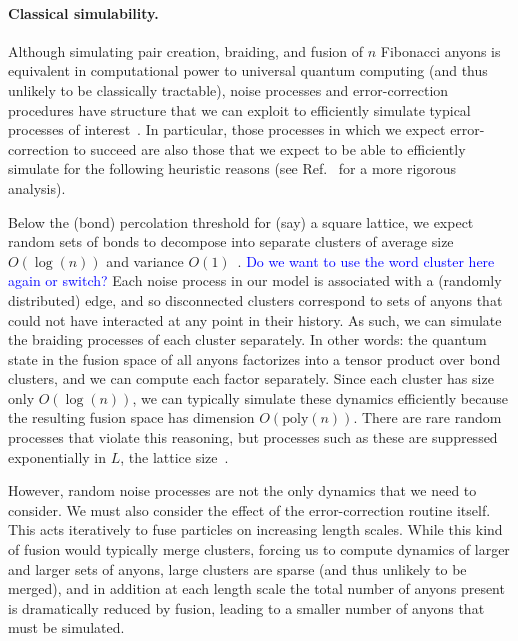 \documentclass[aps, prl, letterpaper, twocolumn, superscriptaddress, notitlepage, 10pt]{revtex4-1}
\newcommand{\cggb}[1]{\textcolor{blue}{#1}}
\begin{document}
\paragraph{Classical simulability.}

Although simulating pair creation, braiding, and fusion of $n$ Fibonacci anyons is equivalent 
in computational power to universal quantum computing (and thus unlikely to be classically 
tractable), noise processes and error-correction procedures have structure that we can 
exploit to efficiently simulate typical processes of interest~\cite{RGsim}. In particular, those 
processes in which we expect error-correction to succeed are also those that we expect to 
be able to efficiently simulate for the following heuristic reasons (see Ref.~\cite{RGsim} 
for a more rigorous analysis).

Below the (bond) percolation threshold for (say) a square lattice, we expect random sets of 
bonds to decompose into separate clusters of average size $O(\log(n))$ and variance 
$O(1)$~\cite{Bazant2000}. \cggb{Do we want to use the word cluster here again or switch?} 
Each noise process in our model is associated with a (randomly distributed) edge, and so 
disconnected clusters correspond to sets of anyons that could not have interacted at any 
point in their history. As such, we can simulate the braiding processes of each cluster 
separately. In other words: the quantum state in the fusion space of all anyons factorizes into 
a tensor product over bond clusters, and we can compute each factor separately. Since each 
cluster has size only $O(\log(n))$, we can typically simulate these dynamics efficiently 
because the resulting fusion space has dimension $O(\mathrm{poly}(n))$. There are rare 
random processes that violate this reasoning, but processes such as these are suppressed 
exponentially in $L$, the lattice size~\cite{Grimmett1989}. 

However, random noise processes are not the only dynamics that we need to consider. We 
must also consider the effect of the error-correction routine itself. This acts iteratively to fuse 
particles on increasing length scales. While this kind of fusion would typically merge clusters, 
forcing us to compute dynamics of larger and larger sets of anyons, large clusters are sparse 
(and thus unlikely to be merged), and in addition at each length scale the total number of 
anyons present is dramatically reduced by fusion, leading to a smaller number of anyons that 
must be simulated.
\end{document}
